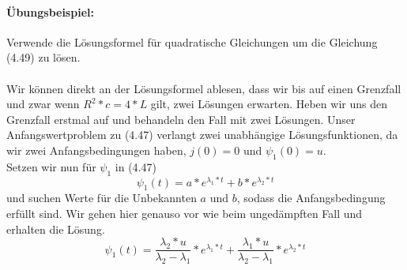 \documentclass[11pt,a4paper,leqno]{report}
\numberwithin{equation}{chapter}
\begin{document}
\paragraph{\"Ubungsbeispiel:} Verwende die L\"osungsformel f\"ur quadratische Gleichungen um die Gleichung (4.49) zu l\"osen.\\
\\
Wir k\"onnen direkt an der L\"osungsformel ablesen, dass wir bis auf einen Grenzfall und zwar wenn $R^2*c = 4*L$ gilt, zwei L\"osungen erwarten.
Heben wir uns den Grenzfall erstmal auf und behandeln den Fall mit zwei L\"osungen. Unser Anfangswertproblem zu (4.47) verlangt zwei unabh\"angige L\"osungsfunktionen, da wir zwei Anfangsbedingungen haben, $j(0)=0$ und $\psi_1(0) = u$. \\
Setzen wir nun f\"ur $\psi_1$ in (4.47) 
\begin{equation}
\psi_1(t) = a*e^{\lambda_1*t} + b*e^{\lambda_2*t}
\end{equation}
und suchen Werte f\"ur die Unbekannten $a$ und $b$, sodass die Anfangsbedingung erf\"ullt sind. 
Wir gehen hier genauso vor wie beim unged\"ampften Fall und erhalten die L\"osung.
\begin{equation}
\psi_1(t) = \frac{\lambda_2*u}{\lambda_2 - \lambda_1}*e^{\lambda_1*t} + \frac{\lambda_1*u}{\lambda_2 - \lambda_1}*e^{\lambda_2*t}
\end{equation}
\end{document}
